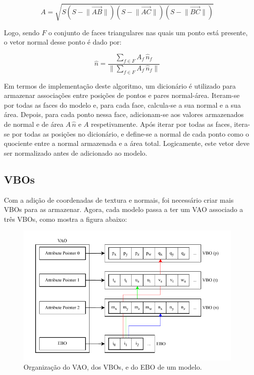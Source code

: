 \documentclass[12pt, a4paper]{article}
\begin{document}
$$
A = \sqrt{
    S
    \left ( S - \lVert \overrightarrow{AB} \rVert \right )
    \left ( S - \lVert \overrightarrow{AC} \rVert \right )
    \left ( S - \lVert \overrightarrow{BC} \rVert \right )
}
$$

Logo, sendo $F$ o conjunto de faces triangulares nas quais um ponto está presente, o vetor normal
desse ponto é dado por:

$$
\hat{n} = \frac{
    \sum_{f \in F} {A_f \, \hat{n}_f}
}{
    \lVert \sum_{f \in F} {A_f \, \hat{n}_f} \rVert
}
$$

Em termos de implementação deste algoritmo, um dicionário é utilizado para armazenar associações
entre posições de pontos e pares normal-área. Iteram-se por todas as faces do modelo e, para
cada face, calcula-se a sua normal e a sua área. Depois, para cada ponto nessa face, adicionam-se
aos valores armazenados de normal e de área $A \, \hat{n}$ e $A$ respetivamente. Após iterar por
todas as faces, itera-se por todas as posições no dicionário, e define-se a normal de cada ponto
como o quociente entre a normal armazenada e a área total. Logicamente, este vetor deve ser
normalizado antes de adicionado ao modelo.

\subsection{VBOs}

Com a adição de coordenadas de textura e normais, foi necessário criar mais VBOs para as armazenar.
Agora, cada modelo passa a ter um VAO associado a três VBOs, como mostra a figura abaixo:

\begin{figure}[H]
    \centering
    \includegraphics[width=\textwidth]{res/phase4/VAO.pdf}
    \caption{Organização do VAO, dos VBOs, e do EBO de um modelo.}
\end{figure}
\end{document}
